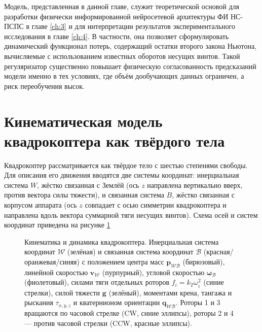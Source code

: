 Модель, представленная в данной главе, служит теоретической основой для разработки физически информированной нейросетевой архитектуры ФИ НС-ПСПС в главе \ref{ch:3} и для интерпретации результатов экспериментального исследования в главе \ref{ch:4}. В частности, она позволяет сформулировать динамический функционал потерь, содержащий остатки второго закона Ньютона, вычисляемые с использованием известных оборотов несущих винтов. Такой регуляризатор существенно повышает физическую согласованность предсказаний модели именно в тех условиях, где объём дообучающих данных ограничен, а риск переобучения высок.


\section{Кинематическая модель квадрокоптера как твёрдого тела}
\label{sec:kinematics}

Квадрокоптер рассматривается как твёрдое тело с шестью степенями свободы. Для описания его движения вводятся две системы координат: инерциальная система \(W\), жёстко связанная с Землёй (ось \(z\) направлена вертикально вверх, против вектора силы тяжести), и связанная система \(B\), жёстко связанная с корпусом аппарата (ось \(z\) совпадает с осью симметрии квадрокоптера и направлена вдоль вектора суммарной тяги несущих винтов). Схема осей и систем координат приведена на рисунке \ref{fig:quadrotor_dynamics}


\begin{figure}[htbp]
	\centering
	\resizebox{0.92\linewidth}{!}{}
	\caption{Кинематика и динамика квадрокоптера. 
		Инерциальная система координат $\mathcal{W}$ (зелёная) и связанная система координат $\mathcal{B}$ 
		(красная/оранжевая/синяя) с положением центра масс $\mathbf{p}_{\mathcal{WB}}$ (бирюзовый), 
		линейной скоростью $\mathbf{v}_{\mathcal{W}}$ (пурпурный), угловой скоростью $\boldsymbol{\omega}_{\mathcal{B}}$ (фиолетовый), 
		силами тяги отдельных роторов $f_i = k_T \omega_i^2$ (синие стрелки), силой тяжести $\mathbf{g}$ (зелёный), 
		моментами крена, тангажа и рыскания $\tau_{x,y,z}$ и кватернионом ориентации $\mathbf{q}_{\mathcal{WB}}$.
		Роторы 1 и 3 вращаются по часовой стрелке (CW, синие эллипсы), 
		роторы 2 и 4 — против часовой стрелки (CCW, красные эллипсы).}
	\label{fig:quadrotor_dynamics}
\end{figure}


